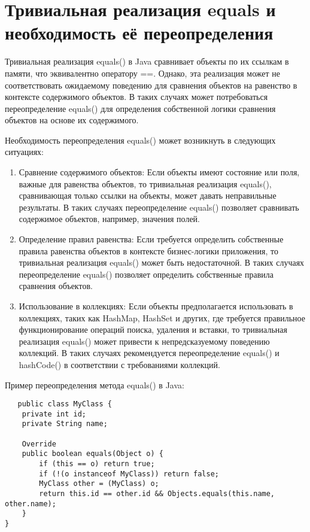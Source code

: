 \section{Тривиальная реализация equals и необходимость её переопределения}
Тривиальная реализация equals() в Java сравнивает объекты по их ссылкам в памяти, что эквивалентно оператору ==. Однако, эта реализация может не соответствовать ожидаемому поведению для сравнения объектов на равенство в контексте содержимого объектов. В таких случаях может потребоваться переопределение equals() для определения собственной логики сравнения объектов на основе их содержимого.

Необходимость переопределения equals() может возникнуть в следующих ситуациях:
\begin{enumerate}
    \item Сравнение содержимого объектов: Если объекты имеют состояние или поля, важные для равенства объектов, то тривиальная реализация equals(), сравнивающая только ссылки на объекты, может давать неправильные результаты. В таких случаях переопределение equals() позволяет сравнивать содержимое объектов, например, значения полей.

    \item Определение правил равенства: Если требуется определить собственные правила равенства объектов в контексте бизнес-логики приложения, то тривиальная реализация equals() может быть недостаточной. В таких случаях переопределение equals() позволяет определить собственные правила сравнения объектов.

    \item Использование в коллекциях: Если объекты предполагается использовать в коллекциях, таких как HashMap, HashSet и других, где требуется правильное функционирование операций поиска, удаления и вставки, то тривиальная реализация equals() может привести к непредсказуемому поведению коллекций. В таких случаях рекомендуется переопределение equals() и hashCode() в соответствии с требованиями коллекций.
\end{enumerate}
Пример переопределения метода equals() в Java:
\begin{lstlisting}
   public class MyClass {
    private int id;
    private String name;

    Override
    public boolean equals(Object o) {
        if (this == o) return true;
        if (!(o instanceof MyClass)) return false;
        MyClass other = (MyClass) o;
        return this.id == other.id && Objects.equals(this.name, other.name);
    }
}
\end{lstlisting}

